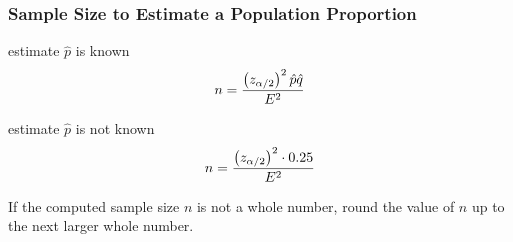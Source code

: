 \documentclass[xcolor=dvipsnames]{beamer}
\begin{document}



\begin{frame}
  \frametitle{Sample Size to Estimate a Population Proportion}
  \begin{block}{estimate $\hat{p}$ is known}
    \begin{equation}
      \label{eq:ienughai}
      n=\frac{\left(z_{\alpha/2}\right)^{2}\hat{p}\hat{q}}{E^{2}}\notag
    \end{equation}
  \end{block}

\medskip

\begin{block}{estimate $\hat{p}$ is not known}
    \begin{equation}
      \label{eq:einohree}
      n=\frac{\left(z_{\alpha/2}\right)^{2}\cdot{}0.25}{E^{2}}\notag
    \end{equation}
\end{block}

If the computed sample size $n$ is not a whole number, round the value
of $n$ \alert{up} to the next larger whole number.
\end{frame}
\end{document}
